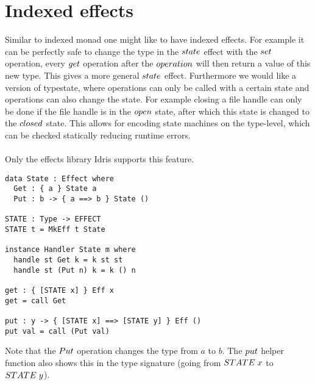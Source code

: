 \section{Indexed effects}
Similar to indexed monad one might like to have indexed effects. For example it can be perfectly safe to change the type in the $\mathnormal{state}$ effect with the $\mathnormal{set}$ operation, every $\mathnormal{get}$ operation after the $\mathnormal{operation}$ will then return a value of this new type. This gives a more general $\mathnormal{state}$ effect.
Furthermore we would like a version of typestate, where operations can only be called with a certain state and operations can also change the state. For example closing a file handle can only be done if the file handle is in the $\mathnormal{open}$ state, after which this state is changed to the $\mathnormal{closed}$ state. This allows for encoding state machines on the type-level, which can be checked statically reducing runtime errors.
\\\\
Only the effects library Idris supports this feature.
\begin{lstlisting}
data State : Effect where
  Get : { a } State a
  Put : b -> { a ==> b } State ()

STATE : Type -> EFFECT
STATE t = MkEff t State

instance Handler State m where
  handle st Get k = k st st
  handle st (Put n) k = k () n

get : { [STATE x] } Eff x
get = call Get

put : y -> { [STATE x] ==> [STATE y] } Eff ()
put val = call (Put val)
\end{lstlisting}
Note that the $\mathnormal{Put}$ operation changes the type from $a$ to $b$. The $\mathnormal{put}$ helper function also shows this in the type signature (going from $\mathnormal{STATE}\; x$ to $\mathnormal{STATE}\;y$).
